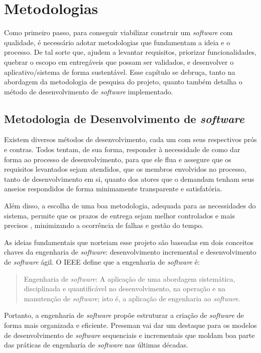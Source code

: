 \chapter{Metodologias}

Como primeiro passo, para conseguir viabilizar construir um \textit{software}
com qualidade, é necessário adotar metodologias que fundamentam a ideia e o
processo. De tal sorte que, ajudem a levantar requisitos, priorizar
funcionalidades, quebrar o escopo em entregáveis que possam ser validados, e
desenvolver o aplicativo/sistema de forma sustentável. Esse capítulo se
debruça, tanto na abordagem da metodologia de pesquisa do projeto, quanto
também detalha o método de desenvolvimento de \textit{software} implementado.

\section{Metodologia de Desenvolvimento de \textit{software}}

Existem diversos métodos de desenvolvimento, cada um com seus respectivos prós
e contras. Todos tentam, de sua forma, responder à necessidade de como dar
forma ao processo de desenvolvimento, para que ele flua e assegure que os
requisitos levantados sejam atendidos, que os membros envolvidos no processo,
tanto de desenvolvimento em si, quanto dos atores que o demandam tenham seus
anseios respondidos de forma minimamente transparente e satisfatória.

Além disso, a escolha de uma boa metodologia, adequada para as necessidades do
sistema, permite que os prazos de entrega sejam melhor controlados e mais
precisos \cite{pressman:2021}, minimizando a ocorrência de falhas e gestão do
tempo.

As ideias fundamentais que norteiam esse projeto são baseadas em dois conceitos
chaves da engenharia de \textit{software}: desenvolvimento incremental e
desenvolvimento de \textit{software} ágil. O IEEE define que a engenharia de
\textit{software} é:

\begin{quote}
  Engenharia de \textit{software}: A aplicação de uma abordagem sistemática,
  disciplinada e quantificável no desenvolvimento, na operação e na manutenção de
  \textit{software}; isto é, a aplicação de engenharia ao \textit{software}.
  \cite[p.~67, tradução nossa]{ieee:1990}
\end{quote}

Portanto, a engenharia de \textit{software} propõe estruturar a criação de
\textit{software} de forma mais organizada e eficiente. Pressman vai dar um
destaque para os modelos de desenvolvimento de \textit{software} sequenciais e
incrementais que moldam boa parte das práticas de engenharia de
\textit{software} nas últimas décadas.

